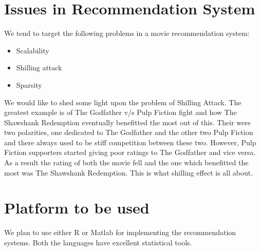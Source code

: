 \documentclass[twocolumn]{article}
\begin{document}
\section{Issues in Recommendation System}
We tend to target the following problems in a movie recommendation system:
\begin{itemize}
\item Scalability
\item Shilling attack
\item Sparsity
\end{itemize}
We would like to shed some light upon the problem of Shilling Attack. The greatest example is of The Godfather v/s Pulp Fiction fight and how The Shawshank Redemption eventually benefitted the most out of this. Their were two polarities, one dedicated to The Godfather and the other two Pulp Fiction and there always used to be stiff competition between these two. However,  Pulp Fiction supporters started giving poor ratings to The Godfather and vice versa. As a result the rating of both the movie fell and the one which benefitted the most was The Shawshank Redemption. This is what shilling effect is all about.

\section{Platform to be used}
We plan to use either R or Matlab for implementing the recommendation systems. Both the languages have excellent statistical tools.
\end{document}
